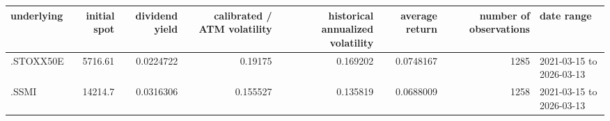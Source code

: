 \begin{tabular}{lrrrrrrl}
\toprule
underlying & initial spot & dividend yield & calibrated / ATM volatility & historical annualized volatility & average return & number of observations & date range \\
\midrule
.STOXX50E & 5716.61 & 0.0224722 & 0.19175 & 0.169202 & 0.0748167 & 1285 & 2021-03-15 to 2026-03-13 \\
.SSMI & 14214.7 & 0.0316306 & 0.155527 & 0.135819 & 0.0688009 & 1258 & 2021-03-15 to 2026-03-13 \\
\bottomrule
\end{tabular}

